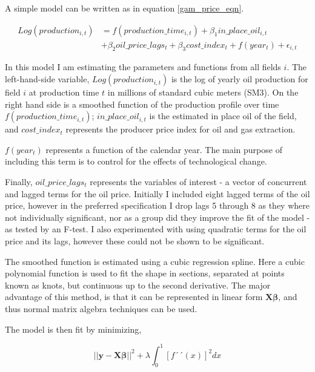 \documentclass[11pt]{article}
\begin{document}
A simple model can be written as in equation \ref{gam_price_eqn}. 

\begin{equation}
\begin{split}

	Log(production_{i,t}) & = f(production\_time_{i,t}) + \beta_1 in\_place\_oil_{i,t} \\
	 \quad & + \beta_2 oil\_price\_lags_t + \beta_3 cost\_index_{t} +  
	 f(year_t) + \epsilon_{i,t}
\label{gam_price_eqn}
\end{split}
\end{equation}

In this model I am estimating the parameters and functions from all fields $i$. The left-hand-side variable, $Log(production_{i,t})$ is the log of yearly oil production for field $i$ at production time $t$ in millions of standard cubic meters (SM3).  On the right hand side is a smoothed function of the production profile over time $f(production\_time_{i,t})$; $in\_place\_oil_{i,t}$ is the estimated in place oil of the field, and $cost\_index_{t}$ represents the producer price index for oil and gas extraction. 

$f(year_t)$ represents a function of the calendar year.  The main purpose of including this term is to control for the effects of technological change.

Finally, $oil\_price\_lags_t$ represents the variables of interest - a vector of concurrent and lagged terms for the oil price. Initially I included eight lagged terms of the oil price, however in the preferred specification I drop lags 5 through 8 as they where not individually significant, nor as a group did they improve the fit of the model - as tested by an F-test. I also experimented with using quadratic terms for the oil price and its lags, however these could not be shown to be significant. 

The smoothed function is estimated using a cubic regression spline. Here a cubic polynomial function is used to fit the shape in sections, separated at points known as knots, but continuous up to the second derivative.  The major advantage of this method, is that it can be represented in linear form $\boldsymbol{X \beta} $, and thus normal matrix algebra techniques can be used.  

The model is then fit by minimizing,

\begin{equation}

||\boldsymbol{y} - \boldsymbol{X\beta} ||^2 + \lambda \int_{0}^{1} [f´´(x)]^2dx

\end{equation}
\end{document}
